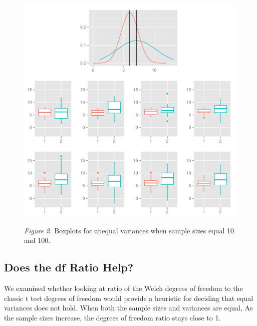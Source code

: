 \documentclass[man,a4paper,noextraspace,apacite]{apa6}\usepackage[]{graphicx}\usepackage[]{color}
\makeatletter
\def\maxwidth{ %
  \ifdim\Gin@nat@width>\linewidth
    \linewidth
  \else
    \Gin@nat@width
  \fi
}
\newenvironment{kframe}{%
 \def\at@end@of@kframe{}%
 \ifinner\ifhmode%
  \def\at@end@of@kframe{\end{minipage}}%
  \begin{minipage}{\columnwidth}%
 \fi\fi%
 \def\FrameCommand##1{\hskip\@totalleftmargin \hskip-\fboxsep
 \colorbox{shadecolor}{##1}\hskip-\fboxsep
     \hskip-\linewidth \hskip-\@totalleftmargin \hskip\columnwidth}%
 \MakeFramed {\advance\hsize-\width
   \@totalleftmargin\z@ \linewidth\hsize
   \@setminipage}}%
 {\par\unskip\endMakeFramed%
 \at@end@of@kframe}
\newenvironment{knitrout}{}{} %
\makeatother
\begin{document}
\begin{figure}
\begin{knitrout}
\color{fgcolor}\begin{kframe}


{\ttfamily\noindent\color{warningcolor}{\#\# Warning: Removed 1 rows containing non-finite values (stat\_boxplot).\\\#\# Warning: Removed 1 rows containing non-finite values (stat\_boxplot).}}\end{kframe}
\includegraphics[width=\maxwidth]{figure/varDifferentBoxplots} 

\end{knitrout}
\textit{Figure 2.} Boxplots for unequal variances when sample sizes equal 10 and 100.
\end{figure}


\subsection{Does the df Ratio Help?}
    We examined whether looking at ratio of the Welch degrees of freedom to the classic t test degrees of freedom would provide a heuristic for deciding that equal variances does not hold. When both the sample sizes and variances are equal,  As the sample sizes increase, the degrees of freedom ratio stays close to 1. 
\end{document}
